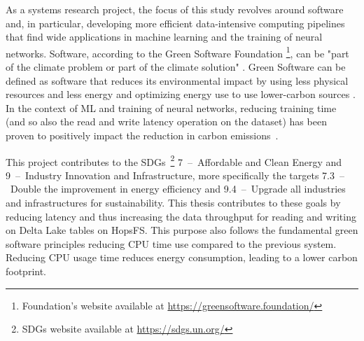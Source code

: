 As a systems research project, the focus of this study revolves around software and, in particular, developing more efficient data-intensive computing pipelines that find wide applications in machine learning and the training of neural networks. Software, according to the Green Software Foundation \footnote{Foundation's website available at \url{https://greensoftware.foundation/}}, can be "part of the climate problem or part of the climate solution" \cite{WhatGreenSoftware2021}. Green Software can be defined as software that reduces its environmental impact by using less physical resources and less energy and optimizing energy use to use lower-carbon sources \cite{WhatGreenSoftware2021}. In the context of \gls{ML} and training of neural networks, reducing training time (and so also the read and write latency operation on the dataset) has been proven to positively impact the reduction in carbon emissions~\cite{pattersonCarbonEmissionsLarge2021,pattersonCarbonFootprintMachine2022}.

This project contributes to the \glspl{SDG}~\footnote{\glspl{SDG} website available at \url{https://sdgs.un.org/}} 7~--~Affordable and Clean Energy and 9~--~Industry Innovation and Infrastructure, more specifically the targets 7.3~--~Double the improvement in energy efficiency and 9.4~--~Upgrade all industries and infrastructures for sustainability. This thesis contributes to these goals by reducing latency and thus increasing the data throughput for reading and writing on Delta Lake tables on \gls{HopsFS}. This purpose also follows the fundamental green software principles reducing \gls{CPU} time use compared to the previous system. Reducing \gls{CPU} usage time reduces energy consumption, leading to a lower carbon footprint.

